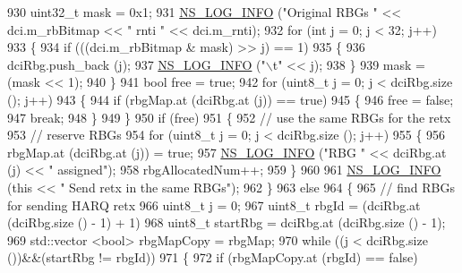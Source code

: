 \begin{DoxyCode}
930           uint32\_t mask = 0x1;
931           \hyperlink{group__logging_gafbd73ee2cf9f26b319f49086d8e860fb}{NS\_LOG\_INFO} (\textcolor{stringliteral}{"Original RBGs "} << dci.m\_rbBitmap << \textcolor{stringliteral}{" rnti "} << dci.m\_rnti);
932           \textcolor{keywordflow}{for} (\textcolor{keywordtype}{int} j = 0; j < 32; j++)
933             \{
934               \textcolor{keywordflow}{if} (((dci.m\_rbBitmap & mask) >> j) == 1)
935                 \{
936                   dciRbg.push\_back (j);
937                   \hyperlink{group__logging_gafbd73ee2cf9f26b319f49086d8e860fb}{NS\_LOG\_INFO} (\textcolor{stringliteral}{"\(\backslash\)t"} << j);
938                 \}
939               mask = (mask << 1);
940             \}
941           \textcolor{keywordtype}{bool} free = \textcolor{keyword}{true};
942           \textcolor{keywordflow}{for} (uint8\_t j = 0; j < dciRbg.size (); j++)
943             \{
944               \textcolor{keywordflow}{if} (rbgMap.at (dciRbg.at (j)) == \textcolor{keyword}{true})
945                 \{
946                   free = \textcolor{keyword}{false};
947                   \textcolor{keywordflow}{break};
948                 \}
949             \}
950           \textcolor{keywordflow}{if} (free)
951             \{
952               \textcolor{comment}{// use the same RBGs for the retx}
953               \textcolor{comment}{// reserve RBGs}
954               \textcolor{keywordflow}{for} (uint8\_t j = 0; j < dciRbg.size (); j++)
955                 \{
956                   rbgMap.at (dciRbg.at (j)) = \textcolor{keyword}{true};
957                   \hyperlink{group__logging_gafbd73ee2cf9f26b319f49086d8e860fb}{NS\_LOG\_INFO} (\textcolor{stringliteral}{"RBG "} << dciRbg.at (j) << \textcolor{stringliteral}{" assigned"});
958                   rbgAllocatedNum++;
959                 \}
960 
961               \hyperlink{group__logging_gafbd73ee2cf9f26b319f49086d8e860fb}{NS\_LOG\_INFO} (\textcolor{keyword}{this} << \textcolor{stringliteral}{" Send retx in the same RBGs"});
962             \}
963           \textcolor{keywordflow}{else}
964             \{
965               \textcolor{comment}{// find RBGs for sending HARQ retx}
966               uint8\_t j = 0;
967               uint8\_t rbgId = (dciRbg.at (dciRbg.size () - 1) + 1) %
968               uint8\_t startRbg = dciRbg.at (dciRbg.size () - 1);
969               std::vector <bool> rbgMapCopy = rbgMap;
970               \textcolor{keywordflow}{while} ((j < dciRbg.size ())&&(startRbg != rbgId))
971                 \{
972                   \textcolor{keywordflow}{if} (rbgMapCopy.at (rbgId) == \textcolor{keyword}{false})

\end{DoxyCode}

